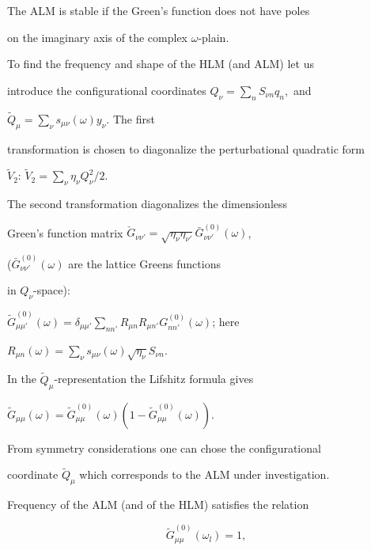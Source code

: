 The ALM is stable if the Green's function does not have poles 

on the imaginary axis of the complex $\omega$-plain.



To find the frequency and shape of the HLM (and ALM) let us 

introduce the configurational coordinates 
$Q_{\nu} = \sum_{n} S_{\nu n} q_n,$ and  

$\tilde{Q}_{\mu} = \sum_{\nu} s_{\mu \nu} (\omega) y_{\nu}$. The first 

transformation is chosen to diagonalize the perturbational quadratic form 

$\tilde{V}_2$: $\tilde{V}_2 = \sum_{\nu} \eta_{\nu} Q_{\nu}^2/2.$

The second transformation diagonalizes the dimensionless 

Green's function matrix $\check{G}_{\nu \nu'}=

\sqrt{\eta_{\nu} \eta_{\nu'}}\bar{G}^{(0)}_{\nu\nu'}(\omega)$, 

($\bar{G}^{(0)}_{\nu\nu'}(\omega)$ are the lattice Greens functions  

in $Q_{\nu}$-space): 

$\tilde{G}^{(0)}_{\mu \mu'}(\omega) = \delta _{\mu \mu'} 

\sum_{nn'} R_{\mu n}R_{\mu n'} G^{(0)}_{n n'} (\omega)$; here

$R_{\mu n} (\omega) =  

\sum_{\nu} s_{\mu \nu}(\omega) \sqrt{\eta_{\nu}} S_{\nu n}$. 

In the $\tilde{Q}_{\mu}$-representation the Lifshitz formula gives 

$\tilde{G}_{\mu \mu}(\omega) =  

{\tilde{G}^{(0)}_{\mu \mu}(\omega)}{(1 -\tilde{G}^{(0)}_{\mu \mu}(\omega))}.$



From symmetry considerations one can chose the configurational 

coordinate $\tilde{Q}_{\mu}$ which corresponds to the ALM under investigation. 

Frequency of the ALM (and of the HLM) satisfies the relation

\begin{equation} 

\tilde{G}^{(0)}_{\mu \mu}(\omega_l) = 1, \label{eq:G} 

\end{equation} 


